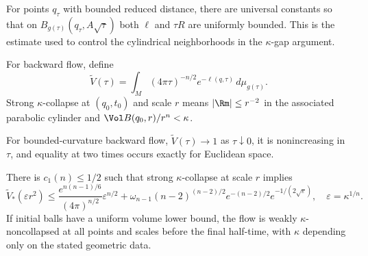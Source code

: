 \begin{lemma}
\label{lem:chow-iii-large-neighborhood-estimates}
For points $q_\tau$ with bounded reduced distance, there are universal constants
so that on $B_{g(\tau)}(q_\tau,A\sqrt\tau)$ both $\ell$ and $\tau R$ are
uniformly bounded.  This is the estimate used to control the cylindrical
neighborhoods in the $\kappa$-gap argument.
\end{lemma}

\begin{definition}
\label{def:chow-iii-reduced-volume-strong-collapse}
For backward flow, define
\[
\widetilde V(\tau)=\int_M(4\pi\tau)^{-n/2}e^{-\ell(q,\tau)}\,d\mu_{g(\tau)}.
\]
Strong $\kappa$-collapse at $(q_0,t_0)$ and scale $r$ means
$|\Rm|\le r^{-2}$ in the associated parabolic cylinder and
$\Vol B(q_0,r)/r^n<\kappa$.
\end{definition}

\begin{theorem}
\label{thm:chow-iii-reduced-volume-monotonicity}
For bounded-curvature backward flow, $\widetilde V(\tau)\to1$ as $\tau\downarrow0$,
it is nonincreasing in $\tau$, and equality at two times occurs exactly for
Euclidean space.
\end{theorem}

\begin{theorem}
\label{thm:chow-iii-weakened-no-local-collapsing}
There is $c_1(n)\le1/2$ such that strong $\kappa$-collapse at scale $r$ implies
\[
\widetilde V_*(\varepsilon r^2)\le
\frac{e^{n(n-1)/6}}{(4\pi)^{n/2}}\varepsilon^{n/2}
 +\omega_{n-1}(n-2)^{(n-2)/2}e^{-(n-2)/2}e^{-1/(2\sqrt\varepsilon)},
\quad \varepsilon=\kappa^{1/n}.
\]
If initial balls have a uniform volume lower bound, the flow is weakly
$\kappa$-noncollapsed at all points and scales before the final half-time,
with $\kappa$ depending only on the stated geometric data.
\end{theorem}

